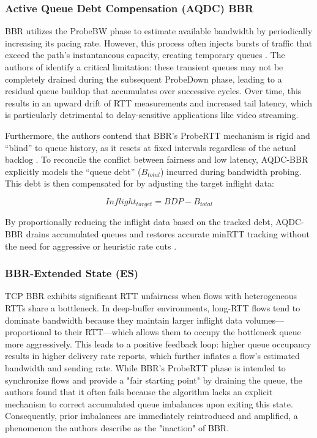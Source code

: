 \subsubsection{Active Queue Debt Compensation (AQDC) BBR}

BBR utilizes the ProbeBW phase to estimate available bandwidth by periodically increasing its pacing rate. 
However, this process often injects bursts of traffic that exceed the path's instantaneous capacity, creating temporary queues \cite{AQDCBBR}. 
The authors of \cite{AQDCBBR} identify a critical limitation: these transient queues may not be completely drained during the subsequent ProbeDown phase, leading to a residual queue buildup that accumulates over successive cycles. 
Over time, this results in an upward drift of RTT measurements and increased tail latency, which is particularly detrimental to delay-sensitive applications like video streaming.

Furthermore, the authors contend that BBR's ProbeRTT mechanism is rigid and ``blind'' to queue history, as it resets at fixed intervals regardless of the actual backlog \cite{AQDCBBR}. 
To reconcile the conflict between fairness and low latency, AQDC-BBR explicitly models the ``queue debt'' ($B_{total}$) incurred during bandwidth probing. 
This debt is then compensated for by adjusting the target inflight data:

\begin{equation}
    Inflight_{target} = BDP - B_{total}
\end{equation}

By proportionally reducing the inflight data based on the tracked debt, AQDC-BBR drains accumulated queues and restores accurate minRTT tracking without the need for aggressive or heuristic rate cuts \cite{AQDCBBR}.

\subsubsection{BBR-Extended State (ES)}
TCP BBR exhibits significant RTT unfairness when flows with heterogeneous RTTs share a bottleneck\cite{BBRES}. 
In deep-buffer environments, long-RTT flows tend to dominate bandwidth because they maintain larger inflight data volumes—proportional to their RTT—which allows them to occupy the bottleneck queue more aggressively\cite{BBRES}. 
This leads to a positive feedback loop: higher queue occupancy results in higher delivery rate reports, which further inflates a flow’s estimated bandwidth and sending rate\cite{BBRES}. 
While BBR’s ProbeRTT phase is intended to synchronize flows and provide a "fair starting point" by draining the queue, the authors found that it often fails because the algorithm lacks an explicit mechanism to correct accumulated queue imbalances upon exiting this state\cite{BBRES}. 
Consequently, prior imbalances are immediately reintroduced and amplified, a phenomenon the authors describe as the "inaction" of BBR\cite{BBRES}.

